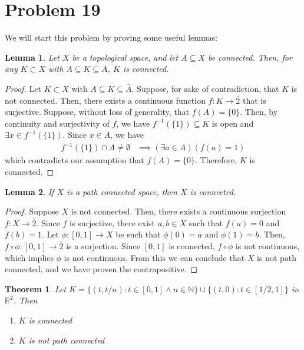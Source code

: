 \documentclass[10pt,a4paper]{article}
\author{Jeremiah Givens}
\theoremstyle{theorem}
\newtheorem{theorem}{Theorem}
\newtheorem{lemma}{Lemma}
\theoremstyle{definition}
\begin{document}
\section*{Problem 19}
We will start this problem by proving some useful lemmas:
\begin{lemma}
Let $X$ be a topological space, and let $A \subseteq X$ be connected. Then, for any $K \subset X$ with $A \subseteq K \subseteq \bar{A}$, $K$ is connected.
\end{lemma}

\begin{proof}
Let $K \subset X$ with $A \subseteq K \subseteq \bar{A}$. Suppose, for sake of contradiction, that $K$ is not connected. Then, there exists a continuous function $f:K \to \bar{2}$ that is surjective. Suppose, without loss of generality, that $f(A) = \{0\}$.  Then,  by continuity and surjectivity of $f$, we have $f^{-1}(\{1\}) \subseteq K$ is open and $\exists x \in f^{-1}(\{1\})$. Since $x \in \bar{A}$,  we have 
\begin{align*}
f^{-1}(\{1\}) \cap A \not = \emptyset &\implies (\exists a \in A)(f(a) = 1)
\end{align*}
which contradicts our assumption that $f(A) = \{0\}$. Therefore, $K$ is connected.
\end{proof}

\begin{lemma}
If $X$ is a path connected space, then $X$ is connected.
\end{lemma}

\begin{proof}
Suppose $X$ is not connected. Then,  there exists a continuous surjection $f: X \to \bar{2}$. Since $f$ is surjective, there exist $a, b \in X$ such that $f(a) = 0$ and $f(b) = 1$.  Let $\phi : [0, 1] \to X$ be such that $\phi(0) = a$ and $\phi(1) = b$. Then,  $f \circ \phi : [0, 1] \to \bar{2}$ is a surjection. Since $[0, 1]$ is connected, $f \circ \phi$ is not continuous, which implies $\phi$ is not continuous. From this we can conclude that $X$ is not path connected, and we have proven the contrapositive.
\end{proof}

\begin{theorem}
Let $K = \{(t, t/n): t \in [0, 1] \land n \in \mathbb{N} \} \cup \{(t, 0): t \in [1/2, 1]\}$ in $\mathbb{R}^2$. Then
\begin{enumerate}
\item $K$ is connected
\item $K$ is not path connected
\end{enumerate}
 \begin{center}
 	\scalebox{0.8}{}
 \end{center}
\end{theorem}
\end{document}
